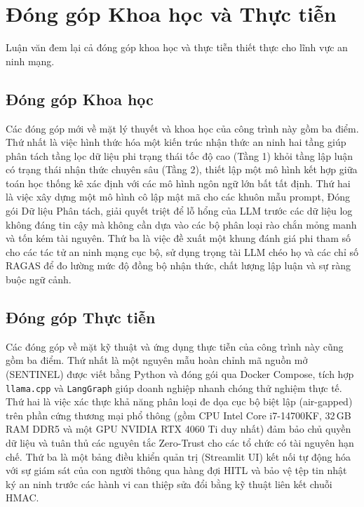 \section{Đóng góp Khoa học và Thực tiễn}
Luận văn đem lại cả đóng góp khoa học và thực tiễn thiết thực cho lĩnh vực an ninh mạng.

\subsection{Đóng góp Khoa học}
Các đóng góp mới về mặt lý thuyết và khoa học của công trình này gồm ba điểm. Thứ nhất là việc hình thức hóa một kiến trúc nhận thức an ninh hai tầng giúp phân tách tầng lọc dữ liệu phi trạng thái tốc độ cao (Tầng 1) khỏi tầng lập luận có trạng thái nhận thức chuyên sâu (Tầng 2), thiết lập một mô hình kết hợp giữa toán học thống kê xác định với các mô hình ngôn ngữ lớn bất tất định. Thứ hai là việc xây dựng một mô hình cô lập mật mã cho các khuôn mẫu prompt, Đóng gói Dữ liệu Phân tách, giải quyết triệt để lỗ hổng của LLM trước các dữ liệu log không đáng tin cậy mà không cần dựa vào các bộ phân loại rào chắn mỏng manh và tốn kém tài nguyên. Thứ ba là việc đề xuất một khung đánh giá phi tham số cho các tác tử an ninh mạng cục bộ, sử dụng trọng tài LLM chéo họ và các chỉ số RAGAS để đo lường mức độ đồng bộ nhận thức, chất lượng lập luận và sự ràng buộc ngữ cảnh.

\subsection{Đóng góp Thực tiễn}
Các đóng góp về mặt kỹ thuật và ứng dụng thực tiễn của công trình này cũng gồm ba điểm. Thứ nhất là một nguyên mẫu hoàn chỉnh mã nguồn mở (SENTINEL) được viết bằng Python và đóng gói qua Docker Compose, tích hợp \texttt{llama.cpp} và \texttt{LangGraph} giúp doanh nghiệp nhanh chóng thử nghiệm thực tế. Thứ hai là việc xác thực khả năng phân loại đe dọa cục bộ biệt lập (air-gapped) trên phần cứng thương mại phổ thông (gồm CPU Intel Core i7-14700KF, 32\,GB RAM DDR5 và một GPU NVIDIA RTX 4060 Ti duy nhất) đảm bảo chủ quyền dữ liệu và tuân thủ các nguyên tắc Zero-Trust cho các tổ chức có tài nguyên hạn chế. Thứ ba là một bảng điều khiển quản trị (Streamlit UI) kết nối tự động hóa với sự giám sát của con người thông qua hàng đợi HITL và bảo vệ tệp tin nhật ký an ninh trước các hành vi can thiệp sửa đổi bằng kỹ thuật liên kết chuỗi HMAC.

